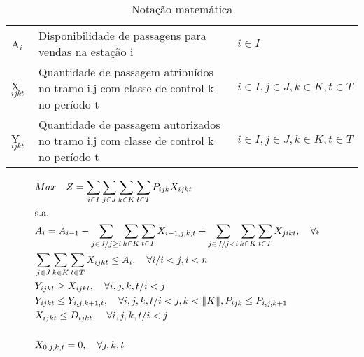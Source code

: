\documentclass[10pt,a4paper]{article}
\begin{document}
\begin{table}[H]
\begin{tabular}{@{}lll@{}}
		A$_{i}$            & Disponibilidade de passagens para vendas na estação i                                & $i \in I$                            \\
		X$_{ijkt}$         & Quantidade de passagem atribuídos no tramo i,j com classe de control k no período t  & $i \in I, j \in J, k \in K, t \in T$ \\
		Y$_{ijkt}$         & Quantidade de passagem autorizados no tramo i,j com classe de control k no período t & $i \in I, j \in J, k \in K, t \in T$ \\ \bottomrule
	\end{tabular}
	\caption{Notação matemática}
	\label{Notacao}
\end{table}

\begin{align}
	 & Max \quad Z = \sum_{i\in I} \sum_{j\in J} \sum_{k\in K} \sum_{t\in T} P_{ijk} X_{ijkt} \label{ecu1}                                                                   & \\
	 & \text{s.a.}  \notag                                                                                                                                                   & \\
	 & A_{i} = A_{i-1} - \sum_{j\in J/j \geq i}\sum_{k\in K}\sum_{t\in T}X_{i-1,j,k,t} + \sum_{j\in J /j<i}\sum_{k\in K}\sum_{t\in T}X_{jikt}, \quad \forall i  \label{ecu2} & \\
	 & \sum_{j \in J}\sum_{k\in K}\sum_{t\in T} X_{ijkt} \leq A_{i} , \quad \forall i/i<j, i < n                                                \label{ecu3}                 & \\
	 & Y_{ijkt} \geq X_{ijkt},  \quad \forall i,j,k,t/ i < j                                                                          \label{ecu4}                           & \\
	 & Y_{ijkt} \leq Y_{i,j,k+1,t},  \quad \forall i,j,k,t / i < j, k < \lVert K \rVert,  P_{ijk} \leq P_{i,j,k+1}                      \label{ecu5}                         & \\
	 & X_{ijkt} \leq D_{ijkt},  \quad \forall i,j,k,t/ i < j                                                                           \label{ecu6}                          & \\[15pt]
	 & X_{0,j,k,t} = 0,     \quad \forall j,k,t                                                                                        \label{ecu7}                          & \\

\end{align}
\end{document}
